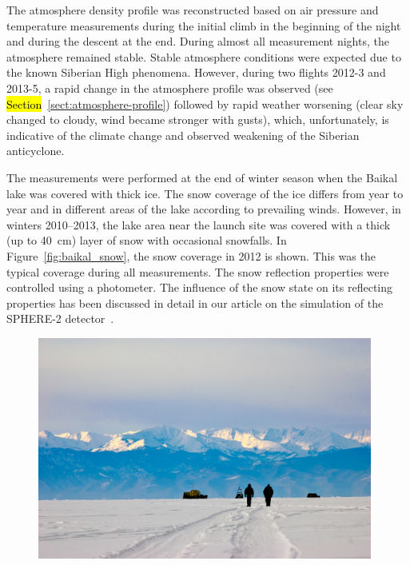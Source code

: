 \documentclass[universe,article,accept,moreauthors,pdftex]{Definitions/mdpi}
\begin{document}
The atmosphere density profile was reconstructed based on air pressure and temperature measurements during the initial climb in the beginning of the night and during the descent at the end. During almost all measurement nights, the atmosphere remained stable. Stable atmosphere conditions were expected due to the known Siberian High phenomena. However, during two flights 2012-3 and 2013-5, a rapid change in the atmosphere profile was observed (see 
\hl{Section}~\ref{sect:atmosphere-profile}) followed by rapid weather worsening (clear sky changed to cloudy, wind became stronger with gusts), which, unfortunately, is indicative of the climate change and observed weakening of the Siberian anticyclone. 


The measurements were performed at the end of winter season when the Baikal lake was covered with thick ice. The snow coverage of the ice differs from year to year and in different areas of the lake according to prevailing winds. However, in winters 2010--2013, the lake area near the launch site was covered with a thick (up to 40~cm) layer of snow with occasional snowfalls. In {Figure}~\ref{fig:baikal_snow}, the snow coverage in 2012 is shown. This was the typical coverage during all measurements. The snow reflection properties were controlled using a photometer. The influence of the snow state on its reflecting properties has been discussed in detail in our article on the simulation of the SPHERE-2 detector~\cite{Ant19}.

       \begin{figure}[H]
       \includegraphics[width=0.98\textwidth]{DSC_7423.jpg}\hspace{2pc}%
        \caption{}
        \label{fig:baikal_atmo}
\end{figure}
\end{document}
